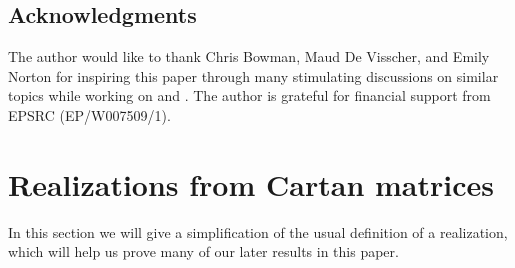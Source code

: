 \documentclass{amsart}
\theoremstyle{plain}
\theoremstyle{definition}
\theoremstyle{remark}
\numberwithin{equation}{section}
\begin{document}
\subsection*{Acknowledgments}

The author would like to thank Chris Bowman, Maud De Visscher, and Emily Norton for inspiring this paper through many stimulating discussions on similar topics while working on \cite{BHN-modularWeylKac} and \cite{bdhn-hsp}.
The author is grateful for financial support from EPSRC (EP/W007509/1).

\section{Realizations from Cartan matrices}


In this section we will give a simplification of the usual definition of a realization, which will help us prove many of our later results in this paper. 
\end{document}
